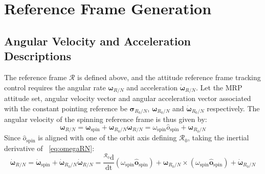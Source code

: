 \documentclass[]{AVSSimReportMemo}
\begin{document}
\section{Reference Frame Generation}
\subsection{Angular Velocity and Acceleration Descriptions}
The reference frame $\mathcal{R}$ is defined above, and the attitude reference frame tracking control requires the angular rate $\bm\omega_{R/N}$ and acceleration $\dot{\bm\omega}_{R/N}$. 
Let the MRP attitude set, angular velocity vector and angular acceleration vector associated with the constant pointing reference be $\bm\sigma_{
R_{0}/N}$, $\bm\omega_{R_{0}/N}$ and $\bm\dot{\omega}_{R_{0}/N}$ respectively.
The angular velocity of the spinning reference frame is thus given by:
\begin{subequations}
	\label{eq:omegaRN}
	\begin{equation}
		\bm\omega_{R/N} = \bm\omega_{\textrm{spin}} + \bm\omega_{R_{0}/N} 
	\end{equation}
	\begin{equation}
		\bm\omega_{R/N} = {\omega}_{\textrm{spin}}\hat{o}_{\textrm{spin}} + \bm\omega_{R_{0}/N}
	\end{equation}
\end{subequations}
Since $\hat {o}_{\textrm{spin}}$ is aligned with one of the orbit axis defining $\mathcal{R}_{0}$, taking the inertial derivative of ~\eqref{eq:omegaRN}:
\begin{subequations}
	\label{eq:domegaRN}
	\begin{equation}
		\dot{\bm\omega}_{R/N} = \dot{\bm\omega}_{\textrm{spin}} +\dot{\bm\omega}_{R_{0}/N} 
	\end{equation}
	\begin{equation}
		\dot{\bm\omega}_{R/N} = \frac{^{\mathcal{R}_{0}} \textrm{d}}{\textrm{dt}} (\omega_{\textrm{spin}}\bm\hat{o}_{\textrm{spin}}) + \bm\omega_{R_{0}/N}\times (\omega_{\textrm{spin}}\bm\hat{o}_{\textrm{spin}}) + \bm{\dot\omega}_{R_{0}/N}
	\end{equation}
\end{subequations}
\end{document}

